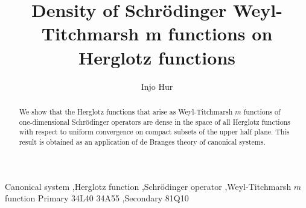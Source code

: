 \documentclass[preprint,12pt]{elsarticle}
\begin{document}
\begin{frontmatter}



\title{Density of Schr\"odinger Weyl-Titchmarsh m functions on Herglotz functions}


\author{Injo Hur}

\address{Mathematics Department, University of Oklahoma, Norman, OK, USA, 73019\\
 and Mathematics Department, Sogang University, Seoul, Republic of Korea, 04107}

\begin{abstract}
We show that the Herglotz functions that arise as Weyl-Titchmarsh $m$ functions of one-dimensional Schr\"odinger operators are dense in the space of all Herglotz functions with respect to uniform convergence on compact subsets of the upper half plane. This result is obtained as an application of de Branges theory of canonical systems. 
\end{abstract}

\begin{keyword}
Canonical system \sep Herglotz function \sep Schr\"odinger operator \sep Weyl-Titchmarsh $m$ function
\MSC[2010] Primary 34L40 34A55 \sep  Secondary 81Q10

\end{keyword}

\end{frontmatter}
\end{document}
